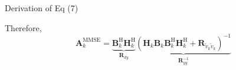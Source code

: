 \documentclass[aspectratio=169, 10pt]{beamer}
\begin{document}
\begin{frame}{Derivation of Eq (7)}
    \vspace{2ex}

    Therefore,
    \begin{equation*}
        \mathbf{A}_k^\mathrm{MMSE} =
        \underbrace{\mathbf{B}_k^\mathrm{H} \mathbf{H}_k^\mathrm{H}}_{\mathbf{R}_{d y}} \underbrace{\left(\mathbf{H}_k \mathbf{B}_k \mathbf{B}_k^\mathrm{H} \mathbf{H}_k^\mathrm{H}+\mathbf{R}_{\tilde{v}_k \tilde{v}_k}\right)^{-1}}_{\mathbf{R}_{y y}^{-1}}
    \end{equation*}
    \begin{flushright}
        \hyperlink{main-mmse_rx_filter}{}
    \end{flushright}

\end{frame}
\end{document}
